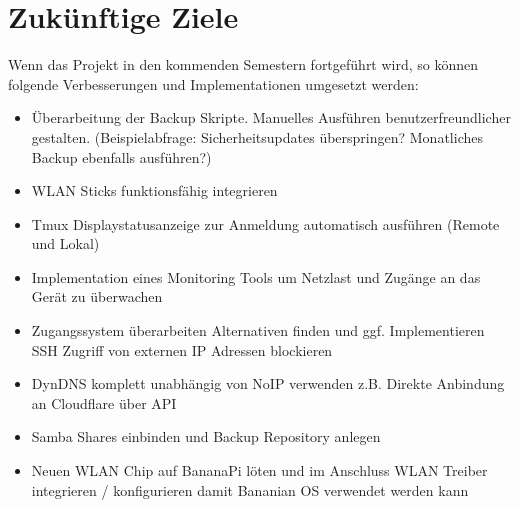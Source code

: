 \chapter{Zukünftige Ziele}
Wenn das Projekt in den kommenden Semestern fortgeführt wird, so können folgende Verbesserungen und Implementationen umgesetzt werden:
\begin{itemize}
\item Überarbeitung der Backup Skripte. Manuelles Ausführen benutzerfreundlicher gestalten. (Beispielabfrage: Sicherheitsupdates überspringen? Monatliches Backup ebenfalls ausführen?)
\item WLAN Sticks funktionsfähig integrieren
\item Tmux Displaystatusanzeige zur Anmeldung automatisch ausführen (Remote und Lokal)
\item Implementation eines Monitoring Tools um Netzlast und Zugänge an das Gerät zu überwachen
\item Zugangssystem überarbeiten Alternativen finden und ggf. Implementieren SSH Zugriff von externen IP Adressen blockieren
\item DynDNS komplett unabhängig von NoIP verwenden z.B. Direkte Anbindung an Cloudflare über API
\item Samba Shares einbinden und Backup Repository anlegen
\item Neuen WLAN Chip auf BananaPi löten und im Anschluss WLAN Treiber integrieren / konfigurieren damit Bananian OS verwendet werden kann





\end{itemize}
